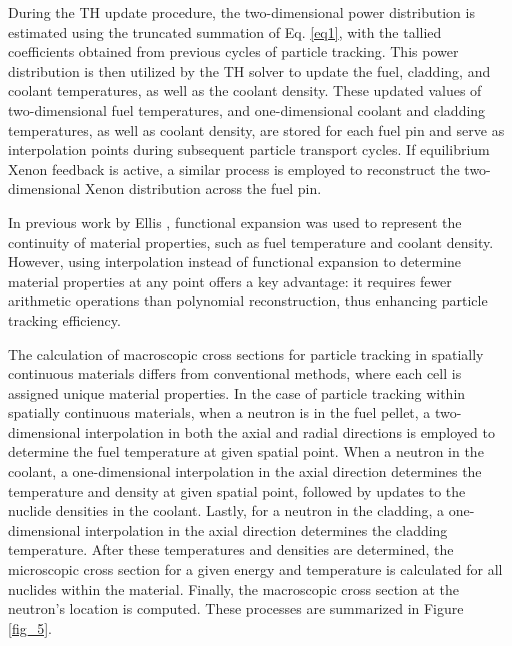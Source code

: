 During the TH update procedure, the two-dimensional power distribution is estimated using the truncated summation of Eq. \ref{eq1}, with the tallied coefficients obtained from previous cycles of particle tracking. This power distribution is then utilized by the TH solver to update the fuel, cladding, and coolant temperatures, as well as the coolant density. These updated values of two-dimensional fuel temperatures, and one-dimensional coolant and cladding temperatures, as well as coolant density, are stored for each fuel pin and serve as interpolation points during subsequent particle transport cycles. If equilibrium Xenon feedback is active, a similar process is employed to reconstruct the two-dimensional Xenon distribution across the fuel pin.

In previous work by Ellis \cite{ellis, ellis_2016}, functional expansion was used to represent the continuity of material properties, such as fuel temperature and coolant density. However, using interpolation instead of functional expansion to determine material properties at any point offers a key advantage: it requires fewer arithmetic operations than polynomial reconstruction, thus enhancing particle tracking efficiency.

The calculation of macroscopic cross sections for particle tracking in spatially continuous materials differs from conventional methods, where each cell is assigned unique material properties. In the case of particle tracking within spatially continuous materials, when a neutron is in the fuel pellet, a two-dimensional interpolation in both the axial and radial directions is employed to determine the fuel temperature at given spatial point. When a neutron in the coolant, a one-dimensional interpolation in the axial direction determines the temperature and density at given spatial point, followed by updates to the nuclide densities in the coolant. Lastly, for a neutron in the cladding, a one-dimensional interpolation in the axial direction determines the cladding temperature. After these temperatures and densities are determined, the microscopic cross section for a given energy and temperature is calculated for all nuclides within the material. Finally, the macroscopic cross section at the neutron's location is computed. These processes are summarized in Figure \ref{fig_5}.

